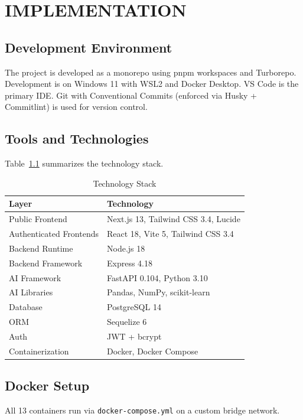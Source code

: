 \chapter{IMPLEMENTATION}

\section{Development Environment}
The project is developed as a monorepo using pnpm workspaces and Turborepo.
Development is on Windows 11 with WSL2 and Docker Desktop. VS Code is the
primary IDE. Git with Conventional Commits (enforced via Husky + Commitlint)
is used for version control.

\section{Tools and Technologies}
Table~\ref{tab:stack} summarizes the technology stack.

\begin{table}[htbp]
  \centering
  \caption{Technology Stack}
  \label{tab:stack}
  \begin{tabular}{@{}ll@{}}
    \toprule
    \textbf{Layer} & \textbf{Technology} \\
    \midrule
    Public Frontend       & Next.js 13, Tailwind CSS 3.4, Lucide \\
    Authenticated Frontends & React 18, Vite 5, Tailwind CSS 3.4 \\
    Backend Runtime       & Node.js 18 \\
    Backend Framework     & Express 4.18 \\
    AI Framework          & FastAPI 0.104, Python 3.10 \\
    AI Libraries          & Pandas, NumPy, scikit-learn \\
    Database              & PostgreSQL 14 \\
    ORM                   & Sequelize 6 \\
    Auth                  & JWT + bcrypt \\
    Containerization      & Docker, Docker Compose \\
    \bottomrule
  \end{tabular}
\end{table}

\section{Docker Setup}
All 13 containers run via \texttt{docker-compose.yml} on a custom bridge
network.

